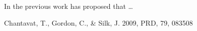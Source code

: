 \documentclass[12pt, a4paper]{article}
\begin{document}
In the previous work \cite{Chantavat_ea2009} has proposed that \ldots

\blinddocument
\begin{thebibliography}{99}
 {Chantavat}, T., {Gordon}, C., \& {Silk}, J. 2009, PRD, 79, 083508
\end{thebibliography}
\end{document}
